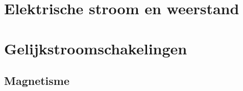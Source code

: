 \documentclass{exam}
\begin{document}
\newpage

\newpage

\section{Elektrische stroom en weerstand}

\vspace{0.5cm}



\newpage

\section{Gelijkstroomschakelingen}

\vspace{0.5cm}



\newpage

\vspace*{\fill}
\begin{center}
    
\section*{Magnetisme}
\end{center}

\vspace*{\fill}

\newpage
\end{document}
